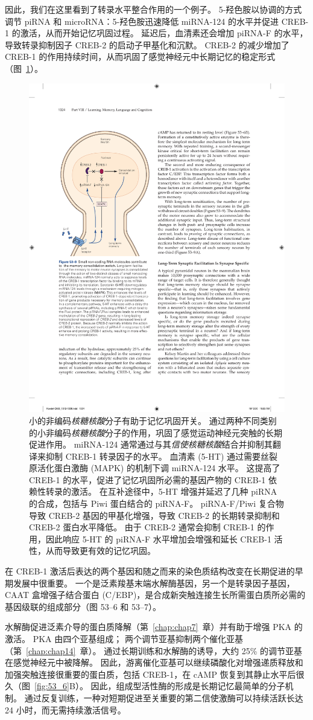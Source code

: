 因此，我们在这里看到了转录水平整合作用的一个例子。 5-羟色胺以协调的方式调节 piRNA 和 microRNA：5-羟色胺迅速降低 miRNA-124 的水平并促进 CREB-1 的激活，从而开始记忆巩固过程。
延迟后，血清素还会增加 piRNA-F 的水平，导致转录抑制因子 CREB-2 的启动子甲基化和沉默。
CREB-2 的减少增加了 CREB-1 的作用持续时间，从而巩固了感觉神经元中长期记忆的稳定形式（图~\ref{fig:53_8}）。


\begin{figure}[htbp]
	\centering
	\includegraphics[width=0.5\linewidth]{chap53/fig_53_8}
	\caption{小的非编码\textit{核糖核酸}分子有助于记忆巩固开关。 通过两种不同类别的小非编码\textit{核糖核酸}分子的作用，巩固了感觉运动神经元突触的长期促进作用。 miRNA-124 通常通过与其\textit{信使核糖核酸}结合并抑制其翻译来抑制 CREB-1 转录因子的水平。 血清素 (5-HT) 通过需要丝裂原活化蛋白激酶 (MAPK) 的机制下调 miRNA-124 水平。 这提高了 CREB-1 的水平，促进了记忆巩固所必需的基因产物的 CREB-1 依赖性转录的激活。 在互补途径中，5-HT 增强并延迟了几种 piRNA 的合成，包括与 Piwi 蛋白结合的 piRNA-F。 piRNA-F/Piwi 复合物导致 CREB-2 基因的甲基化增强，导致 CREB-2 的长期转录抑制和 CREB-2 蛋白水平降低。 由于 CREB-2 通常会抑制 CREB-1 的作用，因此响应 5-HT 的 piRNA-F 水平增加会增强和延长 CREB-1 活性，从而导致更有效的记忆巩固。}
	\label{fig:53_8}
\end{figure}


在 CREB-1 激活后表达的两个基因和随之而来的染色质结构改变在长期促进的早期发展中很重要。
一个是泛素羧基末端水解酶基因，另一个是转录因子基因，CAAT 盒增强子结合蛋白 (C/EBP)，是合成新突触连接生长所需蛋白质所必需的基因级联的组成部分（图 53–6 和 53–7）。


水解酶促进泛素介导的蛋白质降解（第~\ref{chap:chap7}~章）并有助于增强 PKA 的激活。
PKA 由四个亚基组成； 两个调节亚基抑制两个催化亚基（第~\ref{chap:chap14}~章）。
通过长期训练和水解酶的诱导，大约 25\% 的调节亚基在感觉神经元中被降解。
因此，游离催化亚基可以继续磷酸化对增强递质释放和加强突触连接很重要的蛋白质，包括 CREB-1，在 cAMP 恢复到其静止水平后很久（图~\ref{fig:53_6}B）。
因此，组成型活性酶的形成是长期记忆最简单的分子机制。
通过反复训练，一种对短期促进至关重要的第二信使激酶可以持续活跃长达 24 小时，而无需持续激活信号。


